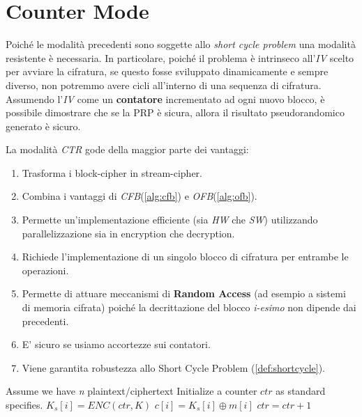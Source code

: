 \section{Counter Mode}
Poiché le modalità precedenti sono soggette allo \textit{short cycle problem} una modalità resistente è necessaria. In particolare, poiché il problema è intrinseco all'\textit{IV} scelto per avviare la cifratura, se questo fosse sviluppato dinamicamente e sempre diverso, non potremmo avere cicli all'interno di una sequenza di cifratura.\\
Assumendo l'\textit{IV} come un \textbf{contatore} incrementato ad ogni nuovo blocco, è possibile dimostrare che se la PRP è sicura, allora il risultato pseudorandomico generato è sicuro.
\begin{note}
La modalità \textit{CTR} gode della maggior parte dei vantaggi:
\end{note}
\begin{enumerate}
    \item [\textcolor{green}{\checkmark}]Trasforma i block-cipher in stream-cipher.
    \item [\textcolor{green}{\checkmark}]Combina i vantaggi di \textit{CFB}(\cref{alg:cfb}) e \textit{OFB}(\cref{alg:ofb}).
    \item [\textcolor{green}{\checkmark}]Permette un'implementazione efficiente (sia \textit{HW} che \textit{SW}) utilizzando parallelizzazione sia in encryption che decryption.
    \item [\textcolor{green}{\checkmark}]Richiede l'implementazione di un singolo blocco di cifratura per entrambe le operazioni.
    \item [\textcolor{green}{\checkmark}]Permette di attuare meccanismi di \textbf{Random Access} (ad esempio a sistemi di memoria cifrata) poiché la decrittazione del blocco \textit{i-esimo} non dipende dai precedenti.
    \item [\textcolor{green}{\checkmark}]E' sicuro se usiamo accortezze sui contatori.
    \item [\textcolor{green}{\checkmark}]Viene garantita robustezza allo Short Cycle Problem (\cref{def:shortcycle}).
\end{enumerate}
\begin{definition}\label{def:ctrmode}
\begin{algorithmic}[1]
\State Assume we have \textit{n} plaintext/ciphertext
\State Initialize a counter $ctr$ as standard specifies\footnotemark.
\State $K_s[i] = ENC(ctr,K)$
\State $c[i] = K_s[i]\oplus{m[i]}$
\State $ctr = ctr + 1$
\EndFor
\end{algorithmic}
\end{definition}
